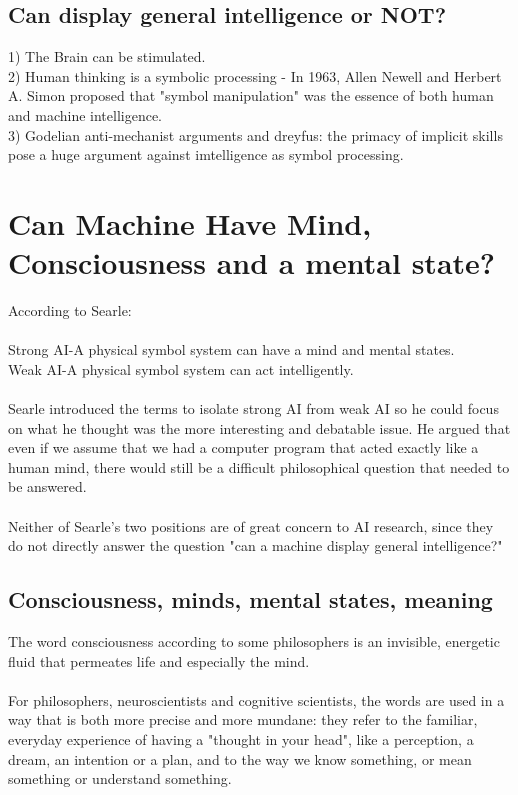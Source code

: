 \documentclass[a4paper]{article}
\begin{document}
\subsection{Can display general intelligence or NOT?}
1) The Brain can be  stimulated.\\
2) Human thinking is a symbolic processing - In 1963, Allen Newell and Herbert A. Simon proposed that "symbol manipulation" was the essence of both human and machine intelligence.\\
3) Godelian anti-mechanist arguments  and dreyfus: the primacy of implicit skills pose a huge argument against imtelligence as symbol processing.


\section{Can Machine Have Mind, Consciousness and a mental state?}
According to Searle:\\\\
Strong AI-A physical symbol system can have a mind and mental states.\\
Weak AI-A physical symbol system can act intelligently.\\
\\
Searle introduced the terms to isolate strong AI from weak AI so he could focus on what he thought was the more interesting and debatable issue. He argued that even if we assume that we had a computer program that acted exactly like a human mind, there would still be a difficult philosophical question that needed to be answered.\\
\\Neither of Searle's two positions are of great concern to AI research, since they do not directly answer the question "can a machine display general intelligence?"
\subsection{Consciousness, minds, mental states, meaning}
The word consciousness according to some philosophers is an invisible, energetic fluid that permeates life and especially the mind.\\\\
For philosophers, neuroscientists and cognitive scientists, the words are used in a way that is both more precise and more mundane: they refer to the familiar, everyday experience of having a "thought in your head", like a perception, a dream, an intention or a plan, and to the way we know something, or mean something or understand something.
\end{document}
